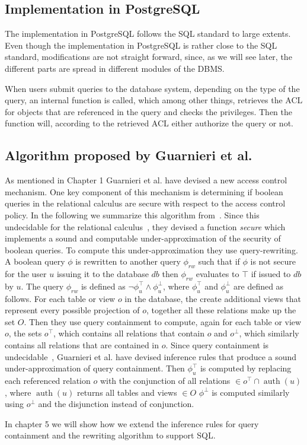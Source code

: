 \subsection{Implementation in PostgreSQL}

The implementation in PostgreSQL follows the SQL standard to large extents. 
%
Even though the implementation in PostgreSQL is rather close to the SQL standard, modifications are not straight forward, since, as we will see later, the different parts are spread in different modules of the DBMS.

When users submit queries to the database system, depending on the type of the query, an internal function is called, which among other things, retrieves the ACL for objects that are referenced in the query and checks the privileges.
%
Then the function will, according to the retrieved ACL either authorize the query or not.

\subsection{Algorithm proposed by Guarnieri et al.}

As mentioned in Chapter 1 Guarnieri et al. have devised a new access control mechanism.
%
One key component of this mechanism is determining if boolean queries in the relational calculus are secure with respect to the access control policy.
%
In the following we summarize this algorithm from~\cite{guarnieri2016strong}.
%
Since this undecidable for the relational calculus~\cite{guarnieri2014optimal}, they devised a function \emph{secure} which implements a sound and computable under-approximation of the security of boolean queries.
%
To compute this under-approximation they use query-rewriting.
%
A boolean query $\phi$ is rewritten to another query $\phi_{rw}$ such that if $\phi$ is not secure for the user $u$ issuing it to the database $db$ then $\phi_{rw}$ evaluates to $\top$ if issued to $db$ by $u$.
%
The query $\phi_{rw}$ is defined as $\lnot \phi^\top_u \land \phi^\bot_u$, where $\phi^\top_u$ and $\phi^\bot_u$ are defined as follows.
%
For each table or view $o$ in the database, the create additional views that represent every possible projection of $o$, together all these relations make up the set $O$.
%
Then they use query containment to compute, again for each table or view $o$, the sets $o^\top$, which contains all relations that contain $o$ and $o^\bot$, which similarly contains all relations that are contained in $o$.
%
Since query containment is undecidable~\cite{abiteboul1995foundations}, Guarnieri et al. have devised inference rules that produce a sound under-approximation of query containment.
%
Then $\phi^\top_u$ is computed by replacing each referenced relation $o$ with the conjunction of all relations $\in o^\top \cap \operatorname{auth}(u)$, where $\operatorname{auth}(u)$ returns all tables and views $\in O$
%
$\phi^\bot$ is computed similarly using $o^\bot$ and the disjunction instead of conjunction.

In chapter 5 we will show how we extend the inference rules for query containment and the rewriting algorithm to support SQL.